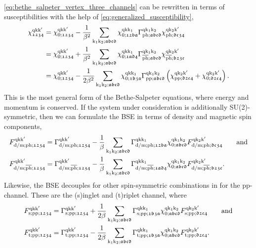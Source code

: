 \documentclass[../../main.tex]{subfiles}
\begin{document}
\eqref{eq:bethe_salpeter_vertex_three_channels} can be rewritten in terms of susceptibilities with the help of \eqref{eq:generalized_susceptibility},
\begin{subequations}\label{eq:bethe_salpeter_susc}
\begin{align}
	\chi^{\text{q}\text{k}\text{k}'}_{\mathfrak{1234}}&=\chi^{\text{q}\text{k}\text{k}'}_{0;\mathfrak{1234}}-\frac{1}{\beta^2}\sum_{\text{k}_1\text{k}_2;\mathfrak{abcd}}\chi^{\text{q}\text{k}\text{k}_1}_{0;\mathfrak{12ba}} \Gamma^{\text{q}\text{k}_1\text{k}_2}_{\text{ph};\mathfrak{abcd}} \chi^{\text{q}\text{k}_2\text{k}'}_{\text{ph};\mathfrak{dc34}}\\
	&=\chi^{\text{q}\text{k}\text{k}'}_{0;\mathfrak{1234}}+\frac{1}{\beta^2}\sum_{\text{k}_1\text{k}_2;\mathfrak{abcd}}\chi^{\text{q}\text{k}\text{k}_1}_{0;\mathfrak{1ad4}} \Gamma^{\text{q}\text{k}_1\text{k}_2}_{\overline{\text{ph}};\mathfrak{abcd}} \chi^{\text{q}\text{k}_2\text{k}'}_{\overline{\text{ph}};\mathfrak{b23c}}\\
	&=\chi^{\text{q}\text{k}\text{k}'}_{0;\mathfrak{1234}}-\frac{1}{2\beta^2}\sum_{\text{k}_1\text{k}_2;\mathfrak{abcd}}\chi^{\text{q}\text{k}\text{k}_1}_{0;\mathfrak{1b3a}}\Gamma^{\text{q}\text{k}_1\text{k}_2}_{\text{pp};\mathfrak{abcd}}\left (\chi^{\text{q}\text{k}_2\text{k}'}_{\text{pp};\mathfrak{d2c4}}+\chi^{\text{q}\text{k}_2\text{k}'}_{0;\mathfrak{d2c4}}\right )\label{eq:bethe_salpeter_susc_pp}.
\end{align}
\end{subequations}
This is the most general form of the Bethe-Salpeter equations, where energy and momentum is conserved. If the system under consideration is additionally SU(2)-symmetric, then we can formulate the BSE in terms of density and magnetic spin components,
\begin{subequations}
\begin{align}
	F_{\text{d}/\text{m};\text{ph};\mathfrak{1234}}^{\text{q}\text{k}\text{k}'}&=\Gamma_{\text{d}/\text{m};\text{ph};\mathfrak{1234}}^{\text{q}\text{k}\text{k}'}-\frac1\beta\sum_{\text{k}_1\text{k}_2;\mathfrak{abcd}} \Gamma_{\text{d}/\text{m};\text{ph};\mathfrak{12ba}}^{\text{q}\text{k}\text{k}_1} \chi_{0;\mathfrak{abcd}}^{\text{q}\text{k}_1\text{k}_2} F_{\text{d}/\text{m};\text{ph};\mathfrak{dc34}}^{\text{q}\text{k}_2\text{k}'}\qquad\text{and}\\
	F_{\text{d}/\text{m};\overline{\text{ph}};\mathfrak{1234}}^{\text{q}\text{k}\text{k}'}&=\Gamma_{\text{d}/\text{m};\overline{\text{ph}};\mathfrak{1234}}^{\text{q}\text{k}\text{k}'}-\frac1\beta\sum_{\text{k}_1\text{k}_2;\mathfrak{abcd}} \Gamma_{\text{d}/\text{m};\overline{\text{ph}};\mathfrak{1ad4}}^{\text{q}\text{k}\text{k}_1} \chi_{0;\mathfrak{abcd}}^{\text{q}\text{k}_1\text{k}_2} F_{\text{d}/\text{m};\overline{\text{ph}};\mathfrak{b23c}}^{\text{q}\text{k}_2\text{k}'}.
\end{align}
\end{subequations}
Likewise, the BSE decouples for other spin-symmetric combinations in for the pp-channel. These are the (s)inglet and (t)riplet channel, where
\begin{align}
	F_{\text{s};\text{pp};\mathfrak{1234}}^{\text{q}\text{k}\text{k}'}&=\Gamma_{\text{s};\text{pp};\mathfrak{1234}}^{\text{q}\text{k}\text{k}'}+\frac{1}{2\beta}\sum_{\text{k}_1\text{k}_2;\mathfrak{abcd}} \Gamma_{\text{s};\text{pp};\mathfrak{1b3a}}^{\text{q}\text{k}\text{k}_1} \chi_{0;\mathfrak{abcd}}^{\text{q}\text{k}_1\text{k}_2} F_{\text{s};\text{pp};\mathfrak{d2c4}}^{\text{q}\text{k}_2\text{k}'}\qquad\text{and}\\
	F_{\text{t};\text{pp};\mathfrak{1234}}^{\text{q}\text{k}\text{k}'}&=\Gamma_{\text{t};\text{pp};\mathfrak{1234}}^{\text{q}\text{k}\text{k}'}-\frac{1}{2\beta}\sum_{\text{k}_1\text{k}_2;\mathfrak{abcd}} \Gamma_{\text{t};\text{pp};\mathfrak{1b3a}}^{\text{q}\text{k}\text{k}_1} \chi_{0;\mathfrak{abcd}}^{\text{q}\text{k}_1\text{k}_2} F_{\text{t};\text{pp};\mathfrak{d2c4}}^{\text{q}\text{k}_2\text{k}'}.
\end{align}
\end{document}
